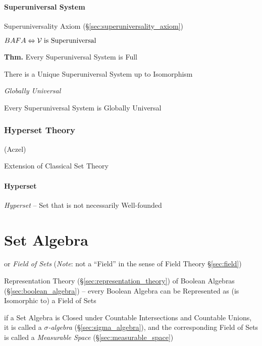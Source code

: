 \paragraph{Superuniversal System}\label{sec:superuniversal_system}
\hfill

Superuniversality Axiom (\S\ref{sec:superuniversality_axiom})

$BAFA \Leftrightarrow \mathcal{V} \;\text{is Superuniversal}$

\textbf{Thm.} Every Superuniversal System is Full

There is a Unique Superuniversal System up to Isomorphism

\emph{Globally Universal}

Every Superuniversal System is Globally Universal



\subsubsection{Hyperset Theory}\label{sec:hyperset_theory}

(Aczel)

Extension of Classical Set Theory




\paragraph{Hyperset}\label{sec:hyperset}\hfill

\emph{Hyperset} -- Set that is not necessarily Well-founded



\section{Set Algebra}\label{sec:set_algebra}

or \emph{Field of Sets} (\emph{Note}: not a ``Field'' in the sense of Field
Theory \S\ref{sec:field})

Representation Theory (\S\ref{sec:representation_theory}) of Boolean Algebras
(\S\ref{sec:boolean_algebra}) -- every Boolean Algebra can be Represented as (is
Isomorphic to) a Field of Sets

if a Set Algebra is Closed under Countable Intersections and Countable Unions,
it is called a \emph{$\sigma$-algebra} (\S\ref{sec:sigma_algebra}), and the
corresponding Field of Sets is called a \emph{Measurable Space}
(\S\ref{sec:measurable_space})

